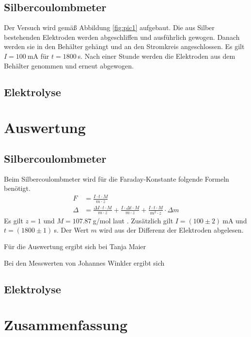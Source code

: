 \documentclass{article}
\begin{document}
\subsection{Silbercoulombmeter}
Der Versuch wird gemäß Abbildung \ref{fig:pic1} aufgebaut. Die aus Silber bestehenden Elektroden werden abgeschliffen und ausführlich gewogen. Danach werden sie in den Behälter gehängt und an den Stromkreis angeschlossen. Es gilt $I=100~$mA für $t=1800~$s. Nach einer Stunde werden die Elektroden aus dem Behälter genommen und erneut abgewogen.


\subsection{Elektrolyse}


\section{Auswertung}

\subsection{Silbercoulombmeter}
Beim Silbercoulombmeter wird für die Faraday-Konstante folgende Formeln benötigt.
\begin{align*}
F &= \frac{I\cdot t\cdot M}{m\cdot z} \\
\Delta &= \frac{\Delta I\cdot t\cdot M}{m\cdot z} + \frac{I\cdot \Delta t\cdot M}{m\cdot z} +\frac{I\cdot t\cdot M}{m^2\cdot z}\cdot \Delta m
\end{align*}
Es gilt $z=1$ und $M=107.87~$g/mol laut \cite{silber}. Zusätzlich gilt $I=(100 \pm 2)~$mA und $t=(1800 \pm 1)~$s. Der Wert $m$ wird aus der Differenz der Elektroden abgelesen.

Für die Auswertung ergibt sich bei Tanja Maier

Bei den Messwerten von Johannes Winkler ergibt sich




\subsection{Elektrolyse}



\section{Zusammenfassung}
\end{document}
